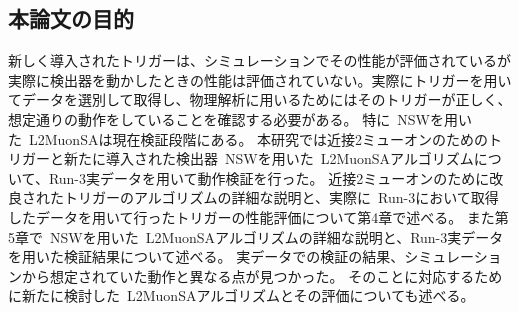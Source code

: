 \subsection{本論文の目的}\label{chapter3-4}
新しく導入されたトリガーは、シミュレーションでその性能が評価されているが実際に検出器を動かしたときの性能は評価されていない。実際にトリガーを用いてデータを選別して取得し、物理解析に用いるためにはそのトリガーが正しく、想定通りの動作をしていることを確認する必要がある。
特に~NSWを用いた~L2MuonSAは現在検証段階にある。
本研究では近接2ミューオンのためのトリガーと新たに導入された検出器~NSWを用いた~L2MuonSAアルゴリズムについて、Run-3実データを用いて動作検証を行った。
近接2ミューオンのために改良されたトリガーのアルゴリズムの詳細な説明と、実際に~Run-3において取得したデータを用いて行ったトリガーの性能評価について第4章で述べる。
また第5章で~NSWを用いた~L2MuonSAアルゴリズムの詳細な説明と、Run-3実データを用いた検証結果について述べる。
実データでの検証の結果、シミュレーションから想定されていた動作と異なる点が見つかった。
そのことに対応するために新たに検討した~L2MuonSAアルゴリズムとその評価についても述べる。